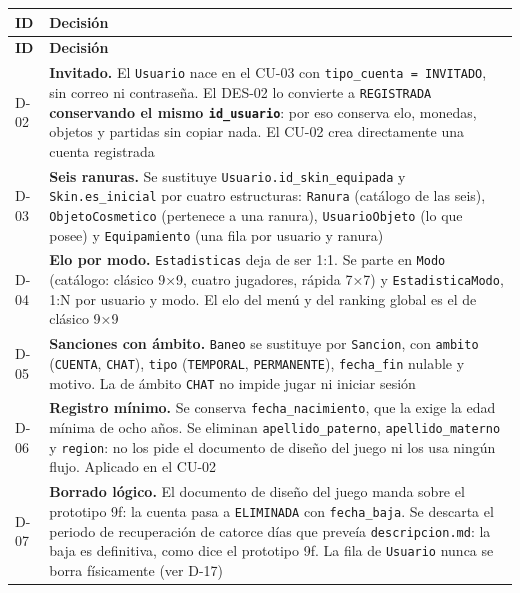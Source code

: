 \begin{center}\small
\begin{longtable}{|L{0.082\textwidth}|L{0.818\textwidth}|}
\hline
\textbf{ID} & \textbf{Decisión} \\ \hline
\endfirsthead
\hline
\textbf{ID} & \textbf{Decisión} \\ \hline
\endhead
\mbox{D-02} & \textbf{Invitado.} El \texttt{Usuario} nace en el \mbox{CU-03} con \texttt{tipo\_\allowbreak{}cuenta = INVITADO}, sin correo ni contraseña. El \mbox{DES-02} lo convierte a \texttt{REGISTRADA} \textbf{conservando el mismo \texttt{id\_\allowbreak{}usuario}}: por eso conserva elo, monedas, objetos y partidas sin copiar nada. El \mbox{CU-02} crea directamente una cuenta registrada \\ \hline
\mbox{D-03} & \textbf{Seis ranuras.} Se sustituye \texttt{Usuario.id\_\allowbreak{}skin\_\allowbreak{}equipada} y \texttt{Skin.es\_\allowbreak{}inicial} por cuatro estructuras: \texttt{Ranura} (catálogo de las seis), \texttt{ObjetoCosmetico} (pertenece a una ranura), \texttt{UsuarioObjeto} (lo que posee) y \texttt{Equipamiento} (una fila por usuario y ranura) \\ \hline
\mbox{D-04} & \textbf{Elo por modo.} \texttt{Estadisticas} deja de ser 1:1. Se parte en \texttt{Modo} (catálogo: clásico 9×9, cuatro jugadores, rápida 7×7) y \texttt{EstadisticaModo}, 1:N por usuario y modo. El elo del menú y del ranking global es el de clásico 9×9 \\ \hline
\mbox{D-05} & \textbf{Sanciones con ámbito.} \texttt{Baneo} se sustituye por \texttt{Sancion}, con \texttt{ambito} (\texttt{CUENTA}, \texttt{CHAT}), \texttt{tipo} (\texttt{TEMPORAL}, \texttt{PERMANENTE}), \texttt{fecha\_\allowbreak{}fin} nulable y motivo. La de ámbito \texttt{CHAT} no impide jugar ni iniciar sesión \\ \hline
\mbox{D-06} & \textbf{Registro mínimo.} Se conserva \texttt{fecha\_\allowbreak{}nacimiento}, que la exige la edad mínima de ocho años. Se eliminan \texttt{apellido\_\allowbreak{}paterno}, \texttt{apellido\_\allowbreak{}materno} y \texttt{region}: no los pide el documento de diseño del juego ni los usa ningún flujo. Aplicado en el \mbox{CU-02} \\ \hline
\mbox{D-07} & \textbf{Borrado lógico.} El documento de diseño del juego manda sobre el prototipo 9f: la cuenta pasa a \texttt{ELIMINADA} con \texttt{fecha\_\allowbreak{}baja}. Se descarta el periodo de recuperación de catorce días que preveía \texttt{descripcion.md}: la baja es definitiva, como dice el prototipo 9f. La fila de \texttt{Usuario} nunca se borra físicamente (ver \mbox{D-17}) \\ \hline

\end{longtable}
\end{center}
